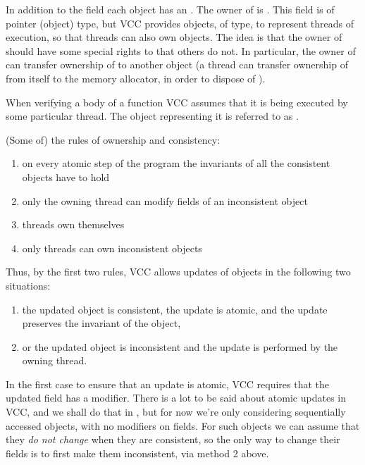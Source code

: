 In addition to the \vcc{\consistent} field each object has an .
The owner of  is .
This field is of pointer (object) type, but
VCC provides objects, of \vcc{\thread}
type, to represent threads of execution, so that threads can also own objects.
The idea is that the owner of  should have some special rights to  that others do not.
In particular, the owner of  can transfer ownership of  to
another object (\eg a thread can transfer ownership of  from itself to the memory allocator, 
in order to dispose of ).

When verifying a body of a function VCC assumes that it is being executed by some
particular thread.
The \vcc{\thread} object representing it is referred to as \vcc{\me}.

(Some of) the rules of ownership and consistency:
\begin{enumerate}
\item on every atomic step of the program the invariants of all the consistent objects have to hold
\item only the owning thread can modify fields of an inconsistent object
\item threads own themselves
\item only threads can own inconsistent objects
\end{enumerate}
Thus, by the first two rules, VCC allows updates of objects in the following two situations:
\begin{enumerate}
\item the updated object is consistent, the update is atomic, and the update preserves the invariant of the object,
\item or the updated object is inconsistent and the update is performed by the owning thread.
\end{enumerate}
In the first case to ensure that an update is atomic, VCC requires that the
updated field has a  modifier.
There is a lot to be said about atomic updates in VCC, and we shall do
that in , but for now we're only considering sequentially
accessed objects, with no  modifiers on fields.
For such objects we can assume that they \emph{do not change}
when they are consistent, so the only way to change their fields is to
first make them inconsistent, \ie via method 2 above.

